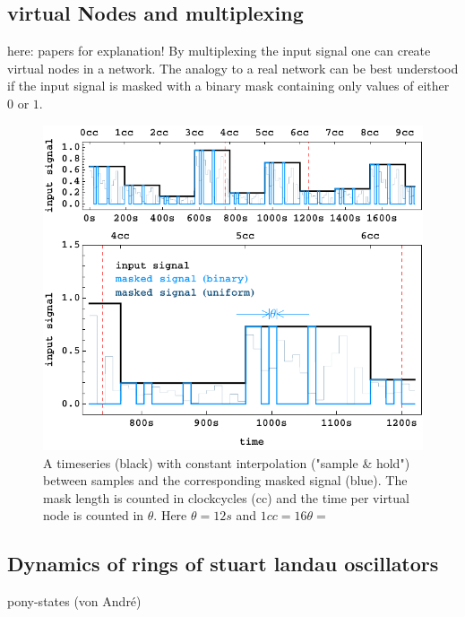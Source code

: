 \subsection{virtual Nodes and multiplexing}
	here: papers for explanation!
	By multiplexing the input signal one can create virtual nodes in a network. The analogy to a real network can be best understood if the input signal is masked with a binary mask containing only values of either $0$ or $1$. 
	

\begin{figure}
	\centering
	\includegraphics[width=0.99\linewidth]{pics/signal_mask_vis}
	\caption{A timeseries (black) with constant interpolation ("sample \& hold") between samples and the corresponding masked signal (blue). The mask length is counted in clockcycles (cc) and the time per virtual node is counted in $\theta$. Here $\theta = 12s$ and $1cc = 16 \theta = $}
	\label{fig:signal_mask_vis}
\end{figure}

	

\subsection{Dynamics of rings of stuart landau oscillators}
	pony-states (von André)
	
	

